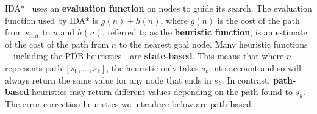\documentclass[letterpaper]{article}
\begin{document}


IDA*~\cite{korf85} uses an \textbf{evaluation function} on nodes to guide its search. The evaluation function used by IDA* is $g(n) + h(n)$, where $g(n)$ is the cost of the path from $s_{init}$ to $n$ and $h(n)$, referred to as the \textbf{heuristic function}, is an estimate of the cost of the path from $n$ to the nearest goal node.
Many heuristic functions---including the PDB heuristics---are \textbf{state-based}.
This means that where $n$ represents path $[s_0, ..., s_k]$, the heuristic  only takes $s_k$ into account and so will always return the same value for any node that ends in $s_k$.
In contrast, \textbf{path-based} heuristics may return different values depending on the path  found to $s_k$. The error correction heuristics we introduce below are path-based.

\end{document}
